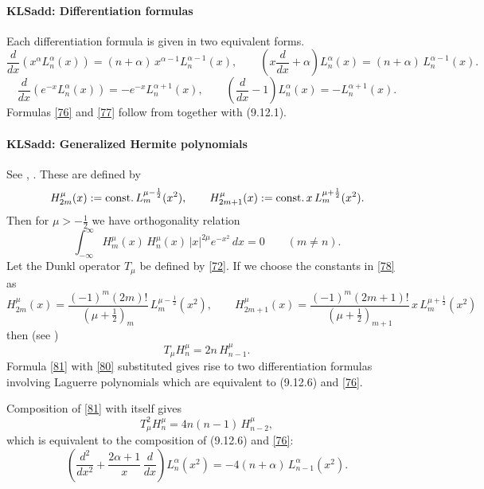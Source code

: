 \documentclass[envcountchap,graybox]{svmono}
\newcounter{rom}
\newcommand\al\alpha
\newcommand\half{\frac12}
\newcommand\thalf{\tfrac12}
\newcommand\iy\infty
\newcommand\const{{\rm const.}\,}
\begin{document}
\paragraph{\large\bf KLSadd: Differentiation formulas}Each differentiation formula is given in two equivalent forms.
\begin{equation}
\frac d{dx}\left(x^\al L_n^\al(x)\right)=
(n+\al)\,x^{\al-1} L_n^{\al-1}(x),\qquad
\left(x\frac d{dx}+\al\right)L_n^\al(x)=
(n+\al)\,L_n^{\al-1}(x).
\label{76}
\end{equation}
%
\begin{equation}
\frac d{dx}\left(e^{-x} L_n^\al(x)\right)=
-e^{-x} L_n^{\al+1}(x),\qquad
\left(\frac d{dx}-1\right)L_n^\al(x)=
-L_n^{\al+1}(x).
\label{77}
\end{equation}
%
Formulas \eqref{76} and \eqref{77} follow from
together with (9.12.1). 
%
\paragraph{\large\bf KLSadd: Generalized Hermite polynomials}See , \cite[Section 1.5.1]{K26}.
These are defined by
\begin{equation}
H_{2m}^\mu(x):=\const L_m^{\mu-\half}(x^2),\qquad
H_{2m+1}^\mu(x):=\const x\,L_m^{\mu+\half}(x^2).
\label{78}
\end{equation}
Then for $\mu>-\thalf$ we have orthogonality relation
\begin{equation}
\int_{-\iy}^{\iy} H_m^\mu(x)\,H_n^\mu(x)\,|x|^{2\mu}e^{-x^2}\,dx
=0\qquad(m\ne n).
\label{79}
\end{equation}
Let the Dunkl operator $T_\mu$ be defined by \eqref{72}.
If we choose the constants in \eqref{78} as
\begin{equation}
H_{2m}^\mu(x)=\frac{(-1)^m(2m)!}{(\mu+\thalf)_m}\,L_m^{\mu-\half}(x^2),\qquad
H_{2m+1}^\mu(x)=\frac{(-1)^m(2m+1)!}{(\mu+\thalf)_{m+1}}\,
 x\,L_m^{\mu+\half}(x^2)
 \label{80}
\end{equation}
then (see \cite[(1.6)]{K5})
\begin{equation}
T_\mu H_n^\mu=2n\,H_{n-1}^\mu.
\label{81}
\end{equation}
Formula \eqref{81} with \eqref{80} substituted gives rise to two
differentiation formulas involving Laguerre polynomials which are equivalent to
(9.12.6) and \eqref{76}.

Composition of \eqref{81} with itself gives
\[
T_\mu^2 H_n^\mu=4n(n-1)\,H_{n-2}^\mu,
\]
which is equivalent to the composition of (9.12.6) and \eqref{76}:
\begin{equation}
\left(\frac{d^2}{dx^2}+\frac{2\al+1}x\,\frac d{dx}\right)L_n^\al(x^2)
=-4(n+\al)\,L_{n-1}^\al(x^2).
\label{82}
\end{equation}
%
\end{document}
